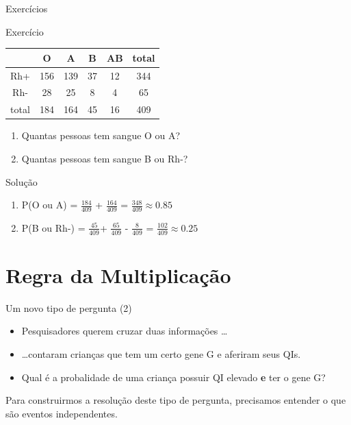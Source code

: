 \documentclass{beamer}
\begin{document}
\begin{frame}{Exercícios}
  \begin{block}{Exercício}
    \begin{tabular}{ccccc|c}
      & O & A & B & AB & total\\
      \hline
      Rh+ & 156 & 139 & 37 & 12 & 344\\
      Rh- & 28 & 25 & 8 & 4 & 65\\
      \hline
      total & 184 & 164 & 45 & 16 & 409\\
    \end{tabular}
    \begin{enumerate}
    \item<1-> Quantas pessoas tem sangue O ou A?
    \item<1-> Quantas pessoas tem sangue B ou Rh-?
    \end{enumerate}
  \end{block}
  \begin{block}{Solução}
    \begin{enumerate}
    \item P(O ou A) = $\frac{184}{409}$ + $\frac{164}{409}$ =
      $\frac{348}{409} \approx 0.85$
    \item P(B ou Rh-) = $\frac{45}{409}$+ $\frac{65}{409}$ -
      $\frac{8}{409}$ = $\frac{102}{409} \approx 0.25$
    \end{enumerate}
  \end{block}
\end{frame}

\section{Regra da Multiplicação}


\begin{frame}{Um novo tipo de pergunta (2)}
  \begin{example}
    \begin{itemize}
    \item Pesquisadores querem cruzar duas informações \ldots
    \item \ldots contaram crianças que tem um certo gene G e aferiram seus
      QIs.
    \item Qual é a probalidade de uma criança possuir QI elevado
      \alert{{\bf e}} ter o gene G?
    \end{itemize}
  \end{example}

  Para construirmos a resolução deste tipo de pergunta, precisamos entender o que são eventos independentes.
\end{frame}
\end{document}
